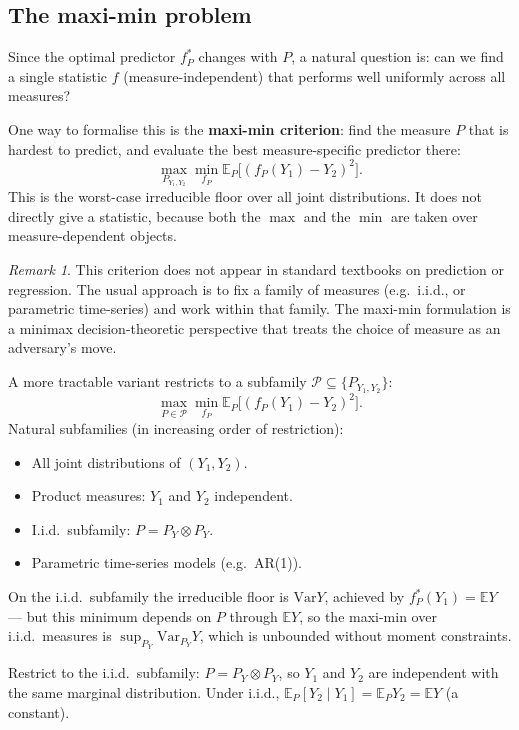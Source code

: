 \documentclass[a4paper,oneside,12pt]{extarticle}
\theoremstyle{plain}
\theoremstyle{definition}
\theoremstyle{remark}
\newtheorem{remark}[proposition]{Remark}
\newcommand*{\E}{\mathbb{E}}
\newcommand*{\Var}{\mathrm{Var}}
\begin{document}
\subsection{The maxi-min problem}

Since the optimal predictor $f_P^*$ changes with $P$, a natural
question is: can we find a single statistic $f$ (measure-independent)
that performs well uniformly across all measures?

One way to formalise this is the \textbf{maxi-min criterion}: find the
measure $P$ that is hardest to predict, and evaluate the best
measure-specific predictor there:
\[
  \max_{P_{Y_1,Y_2}} \min_{f_P} \E_P\bigl[(f_P(Y_1) - Y_2)^2\bigr].
\]
This is the worst-case irreducible floor over all joint distributions.
It does not directly give a statistic, because both the $\max$ and the
$\min$ are taken over measure-dependent objects.

\begin{remark}
This criterion does not appear in standard textbooks on prediction or
regression. The usual approach is to fix a family of measures (e.g.\
i.i.d., or parametric time-series) and work within that family.
The maxi-min formulation is a minimax decision-theoretic perspective
that treats the choice of measure as an adversary's move.
\end{remark}

A more tractable variant restricts to a subfamily
$\mathcal{P} \subseteq \{P_{Y_1,Y_2}\}$:
\[
  \max_{P \in \mathcal{P}} \min_{f_P} \E_P\bigl[(f_P(Y_1) - Y_2)^2\bigr].
\]
Natural subfamilies (in increasing order of restriction):
\begin{itemize}
  \item All joint distributions of $(Y_1,Y_2)$.
  \item Product measures: $Y_1$ and $Y_2$ independent.
  \item I.i.d.\ subfamily: $P = P_Y \otimes P_Y$.
  \item Parametric time-series models (e.g.\ AR(1)).
\end{itemize}
On the i.i.d.\ subfamily the irreducible floor is $\Var Y$, achieved
by $f_P^*(Y_1) = \E Y$ --- but this minimum depends on $P$ through
$\E Y$, so the maxi-min over i.i.d.\ measures is
$\sup_{P_Y} \Var_{P_Y} Y$, which is unbounded without moment
constraints.



Restrict to the i.i.d.\ subfamily: $P = P_Y \otimes P_Y$, so
$Y_1$ and $Y_2$ are independent with the same marginal distribution.
Under i.i.d., $\E_P[Y_2 \mid Y_1] = \E_P Y_2 = \E Y$ (a constant).
\end{document}
